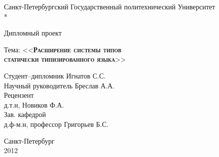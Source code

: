 \begin{titlepage}
\newpage

\begin{center}
Санкт-Петербургский Государственный политехнический Университет \\*
\hrulefill
\end{center}


\vspace{8em}

\begin{center}
\Large Дипломный проект
\end{center}


\begin{center}
Тема: <<\textsc{\textbf{Расширение системы типов \\ статически типизированного языка}}>>
\end{center}

\vspace{6em}

\begin{flushleft}
Студент--дипломник \hrulefill Игнатов С.С. \\
\vspace{1.5em}
Научный руководитель \hrulefill Бреслав А.А.\\
\vspace{1.5em}
Рецензент \\
д.т.н, \hrulefill Новиков Ф.А.\\
\vspace{1.5em}
Зав. кафедрой  \\
д.ф-м.н, профессор \hrulefill Григорьев Б.С.
\end{flushleft}

\vspace{\fill}

\begin{center}
Санкт-Петербург \\ 2012
\end{center}

\end{titlepage}